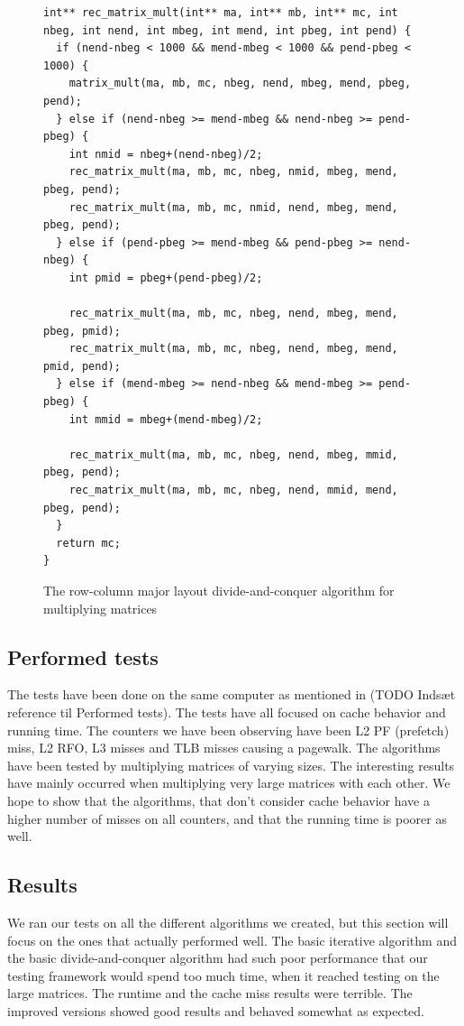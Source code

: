 \documentclass{article}
\begin{document}
\begin{figure}[H]
	\centering
	\begin{lstlisting}
int** rec_matrix_mult(int** ma, int** mb, int** mc, int nbeg, int nend, int mbeg, int mend, int pbeg, int pend) {
  if (nend-nbeg < 1000 && mend-mbeg < 1000 && pend-pbeg < 1000) {
    matrix_mult(ma, mb, mc, nbeg, nend, mbeg, mend, pbeg, pend);
  } else if (nend-nbeg >= mend-mbeg && nend-nbeg >= pend-pbeg) {
    int nmid = nbeg+(nend-nbeg)/2;
    rec_matrix_mult(ma, mb, mc, nbeg, nmid, mbeg, mend, pbeg, pend);
    rec_matrix_mult(ma, mb, mc, nmid, nend, mbeg, mend, pbeg, pend);
  } else if (pend-pbeg >= mend-mbeg && pend-pbeg >= nend-nbeg) {
    int pmid = pbeg+(pend-pbeg)/2;

    rec_matrix_mult(ma, mb, mc, nbeg, nend, mbeg, mend, pbeg, pmid);
    rec_matrix_mult(ma, mb, mc, nbeg, nend, mbeg, mend, pmid, pend);
  } else if (mend-mbeg >= nend-nbeg && mend-mbeg >= pend-pbeg) {
    int mmid = mbeg+(mend-mbeg)/2;

    rec_matrix_mult(ma, mb, mc, nbeg, nend, mbeg, mmid, pbeg, pend);
    rec_matrix_mult(ma, mb, mc, nbeg, nend, mmid, mend, pbeg, pend);
  }
  return mc;
}
	\end{lstlisting}	
	\caption{The row-column major layout divide-and-conquer algorithm for multiplying matrices}
	\label{code:daq_matrix_mult}
\end{figure}

\subsection{Performed tests}
The tests have been done on the same computer as mentioned in (TODO Indsæt reference til Performed tests). The tests have all focused on cache behavior and running time. The counters we have been observing have been L2 PF (prefetch) miss, L2 RFO, L3 misses and TLB misses causing a pagewalk. The algorithms have been tested by multiplying matrices of varying sizes. The interesting results have mainly occurred when multiplying very large matrices with each other. We hope to show that the algorithms, that don't consider cache behavior have a higher number of misses on all counters, and that the running time is poorer as well.
\subsection{Results}
We ran our tests on all the different algorithms we created, but this section will focus on the ones that actually performed well. The basic iterative algorithm and the basic divide-and-conquer algorithm had such poor performance that our testing framework would spend too much time, when it reached testing on the large matrices. The runtime and the cache miss results were terrible. The improved versions showed good results and behaved somewhat as expected.
\end{document}
